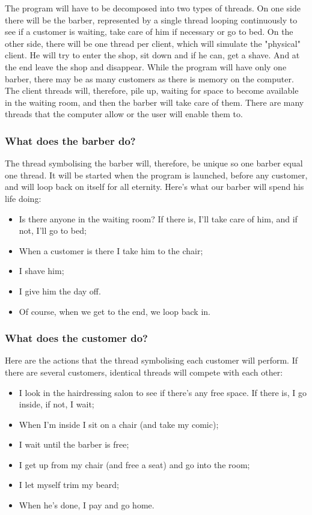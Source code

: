 \documentclass{article}
\begin{document}
The program will have to be decomposed into two types of threads. On one side there will be the barber, represented by a single thread looping continuously to see if a customer is waiting, take care of him if necessary or go to bed. On the other side, there will be one thread per client, which will simulate the "physical" client. He will try to enter the shop, sit down and if he can, get a shave. And at the end leave the shop and disappear.
While the program will have only one barber, there may be as many customers as there is memory on the computer. The client threads will, therefore, pile up, waiting for space to become available in the waiting room, and then the barber will take care of them. There are many threads that the computer allow or the user will enable them to.

\subsubsection{ What does the barber do?}
The thread symbolising the barber will, therefore, be unique so one barber equal one thread. It will be started when the program is launched, before any customer, and will loop back on itself for all eternity.
Here's what our barber will spend his life doing:

\begin{itemize}
    \item Is there anyone in the waiting room? If there is, I'll take care of him, and if not, I'll go to bed;
    \item When a customer is there I take him to the chair;
    \item I shave him;
    \item I give him the day off.
    \item Of course, when we get to the end, we loop back in.
\end{itemize}

\subsubsection{ What does the customer do?}

Here are the actions that the thread symbolising each customer will perform. If there are several customers, identical threads will compete with each other:

\begin{itemize}
    \item I look in the hairdressing salon to see if there's any free space. If there is, I go inside, if not, I wait;
    \item When I'm inside I sit on a chair (and take my comic);
    \item I wait until the barber is free;
    \item I get up from my chair (and free a seat) and go into the room;
    \item I let myself trim my beard;
    \item When he's done, I pay and go home.
\end{itemize}
\end{document}
